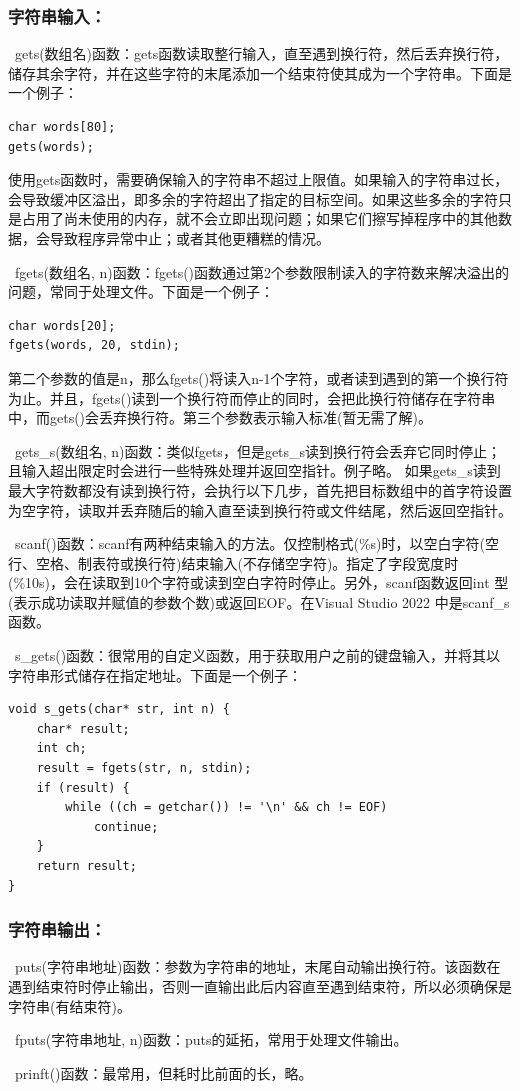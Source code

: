 \documentclass[zihao=-4,UTF8]{report}
\begin{document}
\subsubsection{字符串输入：}
\ gets(数组名)函数：gets函数读取整行输入，直至遇到换行符，然后丢弃换行符，储存其余字符，并在这些字符的末尾添加一个结束符使其成为一个字符串。下面是一个例子：
\begin{lstlisting}
char words[80];
gets(words);
\end{lstlisting}
{\color{gray}\small 使用gets函数时，需要确保输入的字符串不超过上限值。如果输入的字符串过长，会导致缓冲区溢出，即多余的字符超出了指定的目标空间。如果这些多余的字符只是占用了尚未使用的内存，就不会立即出现问题；如果它们擦写掉程序中的其他数据，会导致程序异常中止；或者其他更糟糕的情况。}\par
{}\ fgets(数组名, n)函数：fgets()函数通过第2个参数限制读入的字符数来解决溢出的问题，常同于处理文件。下面是一个例子：
\begin{lstlisting}
char words[20];
fgets(words, 20, stdin);
\end{lstlisting}
{\color{gray}\small 第二个参数的值是n，那么fgets()将读入n-1个字符，或者读到遇到的第一个换行符为止。并且，fgets()读到一个换行符而停止的同时，会把此换行符储存在字符串中，而gets()会丢弃换行符。第三个参数表示输入标准(暂无需了解)。}\par
{}\ gets\_s(数组名, n)函数：类似fgets，但是gets\_s读到换行符会丢弃它同时停止；且输入超出限定时会进行一些特殊处理并返回空指针。例子略。
{\color{gray}\small 如果gets\_s读到最大字符数都没有读到换行符，会执行以下几步，首先把目标数组中的首字符设置为空字符，读取并丢弃随后的输入直至读到换行符或文件结尾，然后返回空指针。}\par
{}\ scanf()函数：scanf有两种结束输入的方法。仅控制格式(\%s)时，以空白字符(空行、空格、制表符或换行符)结束输入(不存储空字符)。指定了字段宽度时(\%10s)，会在读取到10个字符或读到空白字符时停止。另外，scanf函数返回int 型(表示成功读取并赋值的参数个数)或返回EOF。{\color{gray}\small 在Visual Studio 2022 中是scanf\_s函数。}\par
{}\ s\_gets()函数：很常用的自定义函数，用于获取用户之前的键盘输入，并将其以字符串形式储存在指定地址。下面是一个例子：
\begin{lstlisting}
void s_gets(char* str, int n) {
    char* result;
    int ch;
    result = fgets(str, n, stdin);
    if (result) {
        while ((ch = getchar()) != '\n' && ch != EOF)
            continue;
    }
    return result;
}
\end{lstlisting}
\subsubsection{字符串输出：}
\ puts(字符串地址)函数：参数为字符串的地址，末尾自动输出换行符。该函数在遇到结束符时停止输出，否则一直输出此后内容直至遇到结束符，所以必须确保是字符串(有结束符)。\par
{}\ fputs(字符串地址, n)函数：puts的延拓，常用于处理文件输出。\par
{}\ prinft()函数：最常用，但耗时比前面的长，略。
\end{document}
